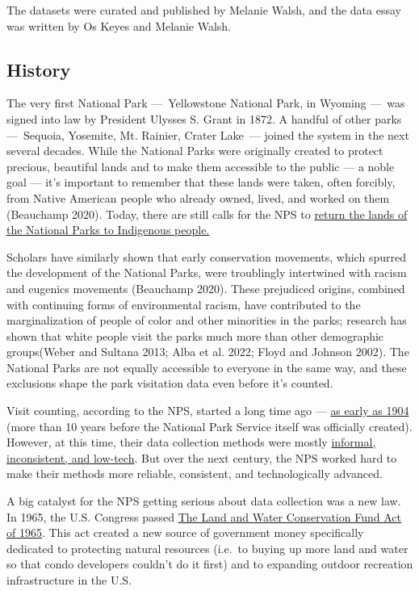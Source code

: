 \documentclass[
  letterpaper,
  DIV=11,
  numbers=noendperiod]{scrartcl}
\begin{document}
The datasets were curated and published by Melanie Walsh, and the data
essay was written by Os Keyes and Melanie Walsh.

\subsection{History}\label{history}

The very first National Park ---~Yellowstone National Park, in Wyoming
---~was signed into law by President Ulysses S. Grant in 1872. A handful
of other parks ---~Sequoia, Yosemite, Mt. Rainier, Crater Lake~---
joined the system in the next several decades. While the National Parks
were originally created to protect precious, beautiful lands and to make
them accessible to the public --- a noble goal --- it's important to
remember that these lands were taken, often forcibly, from Native
American people who already owned, lived, and worked on them (Beauchamp
2020). Today, there are still calls for the NPS to
\href{https://www.theatlantic.com/magazine/archive/2021/05/return-the-national-parks-to-the-tribes/618395/}{return
the lands of the National Parks to Indigenous people.}

Scholars have similarly shown that early conservation movements, which
spurred the development of the National Parks, were troublingly
intertwined with racism and eugenics movements (Beauchamp 2020). These
prejudiced origins, combined with continuing forms of environmental
racism, have contributed to the marginalization of people of color and
other minorities in the parks; research has shown that white people
visit the parks much more than other demographic groups(Weber and
Sultana 2013; Alba et al. 2022; Floyd and Johnson 2002). The National
Parks are not equally accessible to everyone in the same way, and these
exclusions shape the park visitation data even before it's counted.

Visit counting, according to the NPS, started a long time ago ---
\href{https://www.nps.gov/subjects/socialscience/visitor-use-statistics.htm}{as
early as 1904} (more than 10 years before the National Park Service
itself was officially created). However, at this time, their data
collection methods were mostly
\href{https://www.nps.gov/subjects/socialscience/visitor-use-statistics.htm}{informal,
inconsistent, and low-tech}. But over the next century, the NPS worked
hard to make their methods more reliable, consistent, and
technologically advanced.

A big catalyst for the NPS getting serious about data collection was a
new law. In 1965, the U.S. Congress passed
\href{https://www.everycrsreport.com/reports/RL33531.html}{The Land and
Water Conservation Fund Act of 1965}. This act created a new source of
government money specifically dedicated to protecting natural resources
(i.e.~to buying up more land and water so that condo developers couldn't
do it first) and to expanding outdoor recreation infrastructure in the
U.S.
\end{document}
